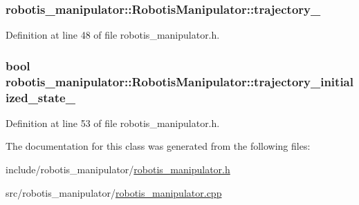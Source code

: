 \subsubsection[{\texorpdfstring{trajectory\+\_\+}{trajectory_}}]{ robotis\+\_\+manipulator\+::\+Robotis\+Manipulator\+::trajectory\+\_\+\hspace{0.3cm}{\ttfamily [private]}}\hypertarget{classrobotis__manipulator_1_1_robotis_manipulator_a992d2c7221bcaab8e9a688d12728d738}{}\label{classrobotis__manipulator_1_1_robotis_manipulator_a992d2c7221bcaab8e9a688d12728d738}


Definition at line 48 of file robotis\+\_\+manipulator.\+h.

\subsubsection[{\texorpdfstring{trajectory\+\_\+initialized\+\_\+state\+\_\+}{trajectory_initialized_state_}}]{\setlength{\rightskip}{0pt plus 5cm}bool robotis\+\_\+manipulator\+::\+Robotis\+Manipulator\+::trajectory\+\_\+initialized\+\_\+state\+\_\+\hspace{0.3cm}{\ttfamily [private]}}\hypertarget{classrobotis__manipulator_1_1_robotis_manipulator_a6ffca122bf46d7d3bd130cbd7ac9f0e4}{}\label{classrobotis__manipulator_1_1_robotis_manipulator_a6ffca122bf46d7d3bd130cbd7ac9f0e4}


Definition at line 53 of file robotis\+\_\+manipulator.\+h.



The documentation for this class was generated from the following files\+:\begin{DoxyCompactItemize}
\item 
include/robotis\+\_\+manipulator/\hyperlink{robotis__manipulator_8h}{robotis\+\_\+manipulator.\+h}\item 
src/robotis\+\_\+manipulator/\hyperlink{robotis__manipulator_8cpp}{robotis\+\_\+manipulator.\+cpp}\end{DoxyCompactItemize}
